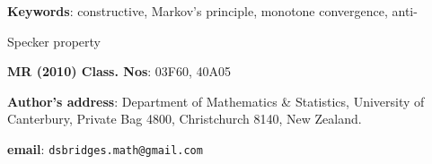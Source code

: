 \documentclass[11pt]{article}%
\begin{document}
\bigskip

\bigskip
%

\noindent
\textbf{Keywords}: constructive, Markov's principle, monotone convergence, anti-%

\noindent
Specker property%

\noindent
\textbf{MR (2010) Class. Nos}: 03F60, 40A05%

\bigskip
%

\bigskip
%

\noindent
\textbf{Author's address}: Department of Mathematics \& Statistics, University
of Canterbury, Private Bag 4800, Christchurch 8140, New Zealand.%

\noindent
\textbf{email}: \texttt{dsbridges.math@gmail.com}
\end{document}
